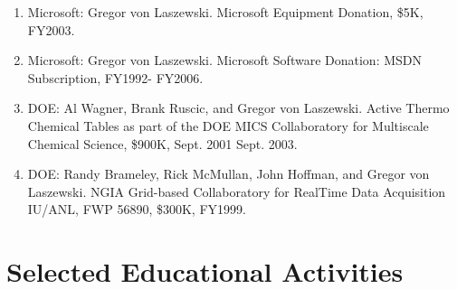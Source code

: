 \documentclass{article}
\begin{document}
\begin{enumerate}
\item  Microsoft: Gregor von Laszewski. Microsoft Equipment Donation, \$5K, FY2003. 
\item  Microsoft: Gregor von Laszewski. Microsoft Software Donation: MSDN Subscription, FY1992- FY2006. 
\item  DOE: Al Wagner, Brank Ruscic, and Gregor von Laszewski. Active Thermo Chemical Tables as part of the DOE MICS Collaboratory for Multiscale Chemical Science, \$900K, Sept. 2001 Sept. 2003. 
\item  DOE: Randy Brameley, Rick McMullan, John Hoffman, and Gregor von Laszewski. NGIA Grid-based Collaboratory for RealTime Data Acquisition IU/ANL, FWP 56890, \$300K, FY1999.

\end{enumerate} 


\section{Selected Educational Activities} 
\end{document}
